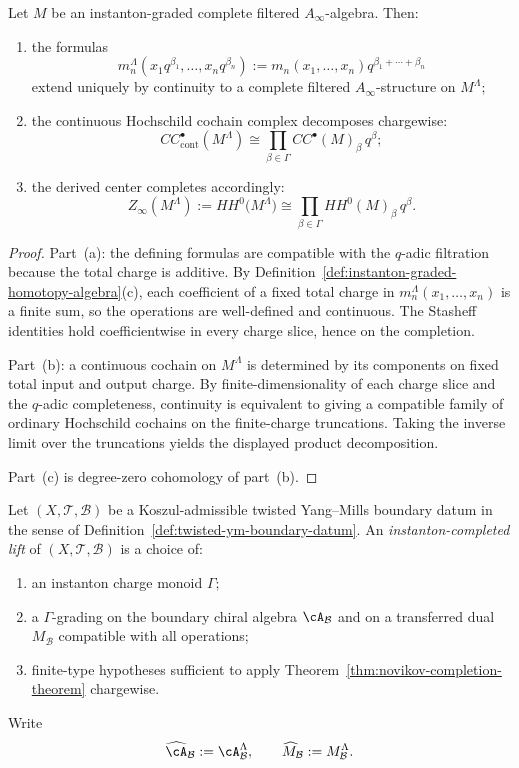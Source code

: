 \begin{theorem}
\label{thm:novikov-completion-theorem}
Let $M$ be an instanton-graded complete filtered $A_{\infty}$-algebra.
Then:
\begin{enumerate}[label=(\alph*)]
\item the formulas
\[
m_n^{\Lambda}(x_1q^{\beta_1},\dots,x_nq^{\beta_n})
:=m_n(x_1,\dots,x_n)q^{\beta_1+\cdots+\beta_n}
\]
extend uniquely by continuity to a complete filtered $A_{\infty}$-structure on $M^{\Lambda}$;
\item the continuous Hochschild cochain complex decomposes chargewise:
\[
CC^{\bullet}_{\mathrm{cont}}(M^{\Lambda})
\cong
\prod_{\beta\in\Gamma} CC^{\bullet}(M)_{\beta}\, q^{\beta};
\]
\item the derived center completes accordingly:
\[
Z_{\infty}(M^{\Lambda})
:=HH^0\bigl(M^{\Lambda}\bigr)
\cong
\prod_{\beta\in\Gamma} HH^0(M)_{\beta}\, q^{\beta}.
\]
\end{enumerate}
\end{theorem}

\begin{proof}
Part~(a): the defining formulas are compatible with the $q$-adic filtration because the total charge is
additive. By Definition~\ref{def:instanton-graded-homotopy-algebra}(c), each coefficient of a fixed total
charge in $m_n^{\Lambda}(x_1,\dots,x_n)$ is a finite sum, so the operations are well-defined and continuous.
The Stasheff identities hold coefficientwise in every charge slice, hence on the completion.

Part~(b): a continuous cochain on $M^{\Lambda}$ is determined by its components on fixed total input
and output charge. By finite-dimensionality of each charge slice and the $q$-adic completeness, continuity
is equivalent to giving a compatible family of ordinary Hochschild cochains on the finite-charge truncations.
Taking the inverse limit over the truncations yields the displayed product decomposition.

Part~(c) is degree-zero cohomology of part~(b).
\end{proof}

\begin{definition}
\label{def:instanton-completed-boundary-datum}
Let $(X,\mathcal T,\mathcal B)$ be a Koszul-admissible twisted Yang--Mills boundary datum in the sense of
Definition~\ref{def:twisted-ym-boundary-datum}. An \emph{instanton-completed lift} of $(X,\mathcal T,\mathcal B)$
is a choice of:
\begin{enumerate}[label=(\roman*)]
\item an instanton charge monoid $\Gamma$;
\item a $\Gamma$-grading on the boundary chiral algebra $\cA_{\mathcal B}$ and on a transferred dual
$M_{\mathcal B}$ compatible with all operations;
\item finite-type hypotheses sufficient to apply Theorem~\ref{thm:novikov-completion-theorem}
chargewise.
\end{enumerate}
Write
\[
\widehat{\cA}_{\mathcal B}:=\cA_{\mathcal B}^{\Lambda},
\qquad
\widehat M_{\mathcal B}:=M_{\mathcal B}^{\Lambda}.
\]
\end{definition}

